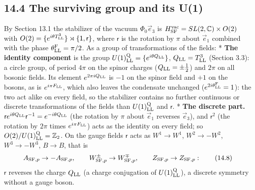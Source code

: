 \documentclass[
  10pt,
]{article}
\begin{document}
\hypertarget{the-surviving-group-and-its-u1}{%
\subsection{14.4 The surviving group and its
U(1)}\label{the-surviving-group-and-its-u1}}

By Section 13.1 the stabilizer of the vacuum \(\Phi_0\vec e_3\) is
\(H^{\rm vac}_{\rm SF}=SL(2,\mathbb C)\times O(2)\) with
\(O(2)=\{e^{i\theta T^3_{\rm LL}}\}\rtimes\{\mathsf 1,\mathsf r\}\),
where \(\mathsf r\) is the rotation by \(\pi\) about \(\vec e_1\)
combined with the phase \(\theta^{\rm F}_{\rm LL}=\pi/2\). As a group of
transformations of the fields: * \textbf{The identity component} is the
group \(U(1)^{\rm Q}_{\rm LL}=\{e^{i\theta Q_{\rm LL}}\}\),
\(Q_{\rm LL}=T^3_{\rm LL}\) (Section 3.3): a circle group, of period
\(4\pi\) on the spinor charges (\(Q_{\rm LL}=\pm\tfrac12\)) and \(2\pi\)
on all bosonic fields. Its element \(e^{2\pi iQ_{\rm LL}}\) is \(-1\) on
the spinor field and \(+1\) on the bosons, as is
\(e^{i\pi F_{\rm LL}}\), which also leaves the condensate unchanged
(\(e^{2i\theta^{\rm F}_{\rm LL}}=1\)): the two act alike on every field,
so the stabilizer contains no further continuous or discrete
transformations of the fields than \(U(1)^{\rm Q}_{\rm LL}\) and
\(\mathsf r\). * \textbf{The discrete part.}
\(\mathsf r e^{i\theta Q_{\rm LL}}\mathsf r^{-1}=e^{-i\theta Q_{\rm LL}}\)
(the rotation by \(\pi\) about \(\vec e_1\) reverses \(\vec e_3\)), and
\(\mathsf r^2\) (the rotation by \(2\pi\) times \(e^{i\pi F_{\rm LL}}\))
acts as the identity on every field; so
\(O(2)/U(1)^{\rm Q}_{\rm LL}=\mathbb Z_2\). On the gauge fields
\(\mathsf r\) acts as \(W^1\to W^1\), \(W^2\to-W^2\), \(W^3\to-W^3\),
\(B\to B\), that is
\[A_{{\rm SF},p}\to-A_{{\rm SF},p},\qquad W^\pm_{{\rm SF},p}\to W^\mp_{{\rm SF},p},\qquad Z_{{\rm SF},p}\to Z_{{\rm SF},p}:\tag{14.8}\]
\(\mathsf r\) reverses the charge \(Q_{\rm LL}\) (a charge conjugation
of \(U(1)^{\rm Q}_{\rm LL}\)), a discrete symmetry without a gauge
boson.
\end{document}
